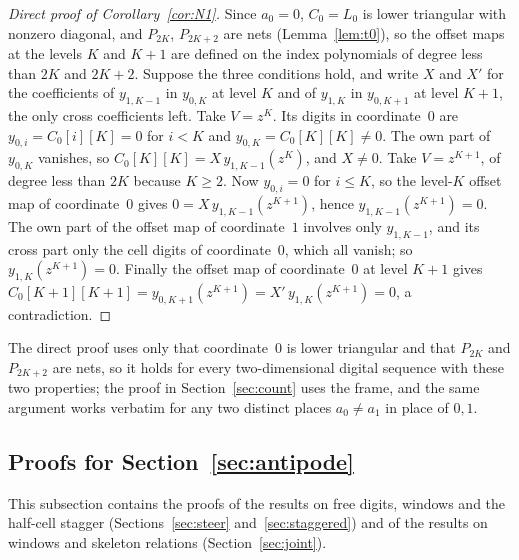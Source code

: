 \begin{proof}[Direct proof of Corollary~\ref{cor:N1}]
Since $a_0=0$, $C_0=L_0$ is lower triangular with nonzero diagonal, and $P_{2K}$, $P_{2K+2}$ are nets (Lemma~\ref{lem:t0}), so the offset maps at the levels $K$ and $K+1$ are defined on the index polynomials of degree less than $2K$ and $2K+2$. Suppose the three conditions hold, and write $X$ and $X'$ for the coefficients of $y_{1,K-1}$ in $y_{0,K}$ at level $K$ and of $y_{1,K}$ in $y_{0,K+1}$ at level $K+1$, the only cross coefficients left.
Take $V=z^K$. Its digits in coordinate~$0$ are $y_{0,i}=C_0[i][K]=0$ for $i<K$ and $y_{0,K}=C_0[K][K]\ne0$. The own part of $y_{0,K}$ vanishes, so $C_0[K][K]=X\,y_{1,K-1}(z^K)$, and $X\ne0$.
Take $V=z^{K+1}$, of degree less than $2K$ because $K\ge2$. Now $y_{0,i}=0$ for $i\le K$, so the level-$K$ offset map of coordinate~$0$ gives $0=X\,y_{1,K-1}(z^{K+1})$, hence $y_{1,K-1}(z^{K+1})=0$. The own part of the offset map of coordinate~$1$ involves only $y_{1,K-1}$, and its cross part only the cell digits of coordinate~$0$, which all vanish; so $y_{1,K}(z^{K+1})=0$. Finally the offset map of coordinate~$0$ at level $K+1$ gives $C_0[K+1][K+1]=y_{0,K+1}(z^{K+1})=X'\,y_{1,K}(z^{K+1})=0$, a contradiction.
\end{proof}

The direct proof uses only that coordinate~$0$ is lower triangular and that $P_{2K}$ and $P_{2K+2}$ are nets, so it holds for every two-dimensional digital sequence with these two properties; the proof in Section~\ref{sec:count} uses the frame, and the same argument works verbatim for any two distinct places $a_0\ne a_1$ in place of $0,1$.


\subsection{Proofs for Section~\ref{sec:antipode}}\label{app:LIproof}
This subsection contains the proofs of the results on free digits, windows and the half-cell stagger (Sections~\ref{sec:steer} and~\ref{sec:staggered}) and of the results on windows and skeleton relations (Section~\ref{sec:joint}).

